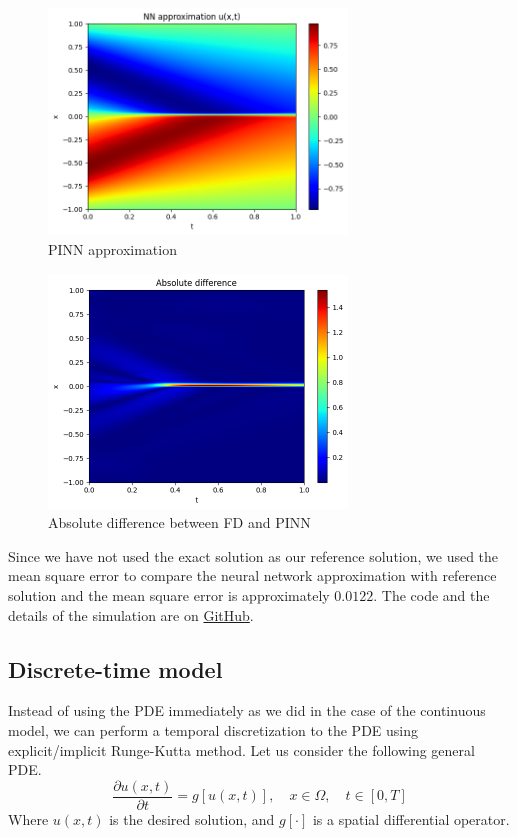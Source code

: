 \documentclass[a4paper,12pt]{article}
\theoremstyle{definition}
\begin{document}
\begin{figure}[H]
    \centering 
    \includegraphics[width=300px]{images/NN_burgers_pde.png}
    \vspace{-1em}
    \caption{PINN approximation}
    \label{pinn_approx_burgers}
\end{figure}

\begin{figure}[H]
    \centering 
    \includegraphics[width=300px]{images/abs_difference_burgers.png}
    \vspace{-1em}
    \caption{Absolute difference between FD and PINN}
    \label{abs_difference_burgers}
\end{figure}

Since we have not used the 
exact solution as our reference solution, we used the mean square error to compare the neural network approximation 
with reference solution and the mean square error is approximately $0.0122$. The code and the details of the simulation
are on \href{https://github.com/HashimAlSadah/MX-Project/blob/main/PINN/continuous_time_model/Continuous_time_PINN_Burgers_PDE.ipynb}
{GitHub}.

\subsection{Discrete-time model}
Instead of using the PDE immediately as we did in the case of the continuous model, 
we can perform a temporal discretization to the PDE using explicit/implicit Runge-Kutta method\cite{raissi2019physics}.
Let us consider the following general PDE.
\begin{equation}\label{main_discrete_time_eq}
\frac{\partial u(x,t)}{\partial t} = g[u(x,t)], \quad x \in \Omega, \quad t \in [0, T]
\end{equation}
Where $u(x,t)$ is the desired solution, and $g[\cdot]$ is a spatial differential operator.
\end{document}
